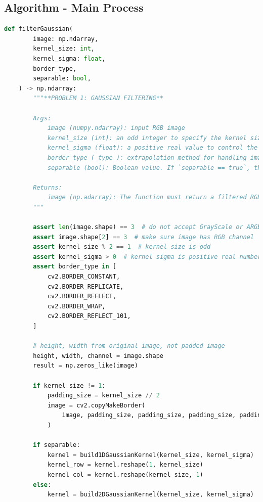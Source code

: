 \documentclass{report}
\begin{document}
\subsection*{Algorithm - Main Process}

\begin{lstlisting}[language=Python, caption=filterGaussian, firstnumber=7]
def filterGaussian(
        image: np.ndarray,
        kernel_size: int,
        kernel_sigma: float,
        border_type,
        separable: bool,
    ) -> np.ndarray:
        """**PROBLEM 1: GAUSSIAN FILTERING**
    
        Args:
            image (numpy.ndarray): input RGB image
            kernel_size (int): an odd integer to specify the kernel size.If this is 5, then the actual kernel size is 5x5.
            kernel_sigma (float): a positive real value to control the shape of the filter kernel.
            border_type (_type_): extrapolation method for handling image boundaries. Possible values are: `cv2.BORDER_CONSTANT`, `cv2.BORDER_REPLICATE`, `cv2.BORDER_REFLECT`, `cv2.BORDER_WRAP`, `cv2.BORDER_REFLECT_101`
            separable (bool): Boolean value. If `separable == true`, then the function performs Gaussian filtering using two 1D filters. Otherwise, the function performs Gaussian filtering using a normal 2D convolution operation.
    
        Returns:
            image (np.adarray): The function must return a filtered RGB image.
        """
    
        assert len(image.shape) == 3  # do not accept GrayScale or ARGB image
        assert image.shape[2] == 3  # make sure image has RGB channel
        assert kernel_size % 2 == 1  # kernel size is odd
        assert kernel_sigma > 0  # kernel sigma is positive real number
        assert border_type in [
            cv2.BORDER_CONSTANT,
            cv2.BORDER_REPLICATE,
            cv2.BORDER_REFLECT,
            cv2.BORDER_WRAP,
            cv2.BORDER_REFLECT_101,
        ]
    
        # height, width from original image, not padded image
        height, width, channel = image.shape
        result = np.zeros_like(image)
    
        if kernel_size != 1:
            padding_size = kernel_size // 2
            image = cv2.copyMakeBorder(
                image, padding_size, padding_size, padding_size, padding_size, border_type
            )
    
        if separable:
            kernel = build1DGaussianKernel(kernel_size, kernel_sigma)
            kernel_row = kernel.reshape(1, kernel_size)
            kernel_col = kernel.reshape(kernel_size, 1)
        else:
            kernel = build2DGaussianKernel(kernel_size, kernel_sigma)
    

\end{lstlisting}
\end{document}
